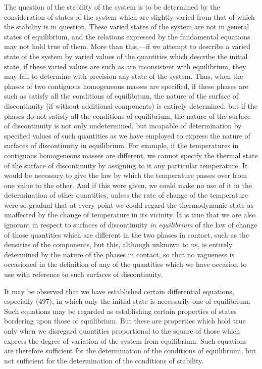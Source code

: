 \documentclass[12pt]{memoir}
\begin{document}
{The question of the stability of the system is to be determined by the consideration of states of the system which are slightly varied from that of which the stability is in question. These varied states of the system are not in general states of equilibrium, and the relations expressed by the fundamental equations may not hold true of them. More than this,---if we attempt to describe a varied state of the system by varied values of the quantities which describe the initial state, if these varied values are such as are inconsistent with equilibrium, they may fail to determine with precision any state of the system. Thus, when the phases of two contiguous homogeneous masses are specified, if these phases are such as satisfy all the conditions of equilibrium, the nature of the surface of discontinuity (if without additional components) is entirely determined; but if the phases do not satisfy all the conditions of equilibrium, the nature of the surface of discontinuity is not only undetermined, but incapable of determination by specified values of such quantities as we have employed to express the nature of surfaces of discontinuity in equilibrium. For example, if the temperatures in contiguous homogeneous masses are different, we cannot specify the thermal state of the surface of discontinuity by assigning to it any particular temperature. It would be necessary to give the law by which the temperature passes over from one value to the other. And if this were given, we could make no use of it in the determination of other quantities, unless the rate of change of the temperature were so gradual that at every point we could regard the thermodynamic state as unaffected by the change of temperature in its vicinity. It is true that we are also ignorant in respect to surfaces of discontinuity \textit{in equilibrium} of the law of change of those quantities which are different in the two phases in contact, such as the densities of the components, but this, although unknown to us, is entirely determined by the nature of the phases in contact, so that no vagueness is occasioned in the definition of any of the quantities which we have occasion to use with reference to such surfaces of discontinuity.

It may be observed that we have established certain differential equations, especially (497), in which only the initial state is necessarily one of equilibrium. Such equations may be regarded as establishing certain properties of states bordering upon those of equilibrium. But these are properties which hold true only when we disregard quantities proportional to the square of those which express the degree of variation of the system from equilibrium. Such equations are therefore sufficient for the determination of the conditions of equilibrium, but not sufficient for the determination of the conditions of stability.

}
\end{document}

